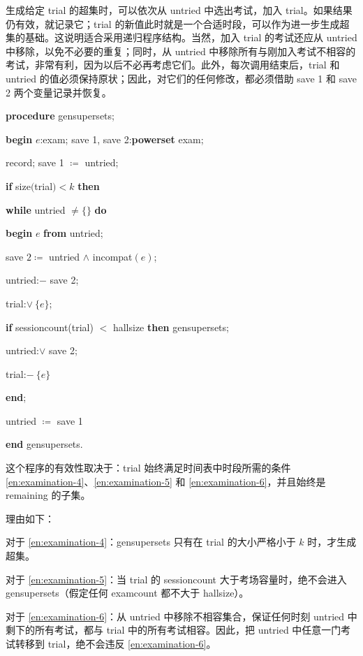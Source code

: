 生成给定 trial 的超集时，可以依次从 untried 中选出考试，加入 trial。如果结果仍有效，就记录它；trial 的新值此时就是一个合适时段，可以作为进一步生成超集的基础。这说明适合采用递归程序结构。当然，加入 trial 的考试还应从 untried 中移除，以免不必要的重复；同时，从 untried 中移除所有与刚加入考试不相容的考试，非常有利，因为以后不必再考虑它们。此外，每次调用结束后，trial 和 untried 的值必须保持原状；因此，对它们的任何修改，都必须借助 save 1 和 save 2 两个变量记录并恢复。

\textbf{procedure} gensupersets;

\quad \textbf{begin} $e$:exam; save 1, save 2:\textbf{powerset} exam;

\quad \quad record; save 1 $\coloneq$ untried;

\quad \quad \textbf{if} size$($trial$) < k$ \textbf{then}

\quad \quad \textbf{while} untried $\neq \{\}$ \textbf{do}

\quad \quad \quad \textbf{begin} $e$ \textbf{from} untried;

\quad \quad \quad \quad save $2\coloneq$ untried $\wedge$ incompat$(e)$;

\quad \quad \quad \quad untried:$-$ save 2;

\quad \quad \quad \quad trial:$\vee\ \{e\}$;

\quad \quad \quad \quad \textbf{if} sessioncount(trial) $<$ hallsize \textbf{then} gensupersets;

\quad \quad \quad \quad untried:$\vee$ save 2;

\quad \quad \quad \quad trial:$-\ \{e\}$

\quad \quad \quad \textbf{end};

\quad \quad \quad untried $\coloneq$ save 1

\quad \textbf{end} gensupersets.

这个程序的有效性取决于：trial 始终满足时间表中时段所需的条件 \ref{en:examination-4}、\ref{en:examination-5} 和 \ref{en:examination-6}，并且始终是 remaining 的子集。

理由如下：

对于 \ref{en:examination-4}：gensupersets 只有在 trial 的大小严格小于 $k$ 时，才生成超集。

对于 \ref{en:examination-5}：当 trial 的 sessioncount 大于考场容量时，绝不会进入 gensupersets（假定任何 examcount 都不大于 hallsize）。

对于 \ref{en:examination-6}：从 untried 中移除不相容集合，保证任何时刻 untried 中剩下的所有考试，都与 trial 中的所有考试相容。因此，把 untried 中任意一门考试转移到 trial，绝不会违反 \ref{en:examination-6}。

